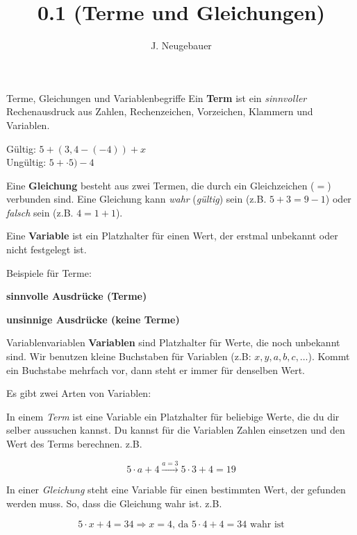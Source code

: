 \documentclass[12pt,a5paper,landscape]{scrartcl}
\author{J. Neugebauer}
\title{0.1 (Terme und Gleichungen)}
\date{\Heute}
\begin{document}
\begin{hilfekarte}{Terme, Gleichungen und Variablen}{begriffe}
	Ein \textbf{Term} ist ein \emph{sinnvoller} Rechenausdruck aus Zahlen, Rechenzeichen, Vorzeichen, Klammern und Variablen.
	
	Gültig: $5+(3,4 - (-4)) + x$\\
	Ungültig: $5+\cdot5)-4$
	
	\vspace{1cm}
	Eine \textbf{Gleichung} besteht aus zwei Termen, die durch ein Gleichzeichen ($=$) verbunden sind. Eine Gleichung kann \emph{wahr} (\emph{gültig}) sein (z.B. $5+3 = 9-1$) oder \emph{falsch} sein (z.B. $4 = 1+1$).
	
	\vspace{1cm}
	Eine \textbf{Variable} ist ein Platzhalter für einen Wert, der erstmal unbekannt oder nicht festgelegt ist.
\end{hilfekarte}

\begin{loesungskarte}
	Beispiele für Terme:
	\begin{multicols}{2}
		\textbf{sinnvolle Ausdrücke (Terme)}
		
		\textbf{unsinnige Ausdrücke (keine Terme)}
	\end{multicols}
\end{loesungskarte}


\begin{hilfekarte}{Variablen}{variablen}
	\textbf{Variablen} sind Platzhalter für Werte, die noch unbekannt sind. Wir benutzen kleine Buchstaben für Variablen (z.B: $x,y,a,b,c,\dots$). Kommt ein Buchstabe mehrfach vor, dann steht er immer für denselben Wert.
	
	Es gibt zwei Arten von Variablen:
	
	In einem \emph{Term} ist eine Variable ein Platzhalter für beliebige Werte, die du dir selber aussuchen kannst. Du kannst für die Variablen Zahlen einsetzen und den Wert des Terms berechnen. z.B.
	
	\[ 5\cdot a + 4 \overset{a = 3}{\longrightarrow} 5\cdot 3 + 4 = 19 \]
	
	In einer \emph{Gleichung} steht eine Variable für einen bestimmten Wert, der gefunden werden muss. So, dass die Gleichung wahr ist. z.B.
	
	\[ 5\cdot x + 4 = 34 \Rightarrow x = 4 \text{, da } 5\cdot 4 + 4 = 34\text{ wahr ist} \]
\end{hilfekarte}

\leereKarte
\end{document}
